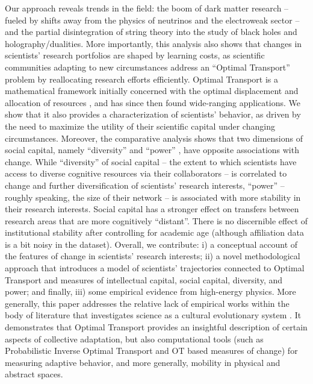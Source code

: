 \documentclass{article}
\begin{document}
Our approach reveals trends in the field: the boom of dark matter research -- fueled by shifts away from the physics of neutrinos and the electroweak sector -- and the partial disintegration of string theory into the study of black holes and holography/dualities. More importantly, this analysis also shows that changes in scientists' research portfolios are shaped by learning costs, as scientific communities adapting to new circumstances address an ``Optimal Transport'' problem by reallocating research efforts efficiently. Optimal Transport is a mathematical framework initially concerned with the optimal displacement and allocation of resources \citep{monge1781memoire,kantorovich2006translocation,Peyr2019}, and has since then found wide-ranging applications. We show that it also provides a characterization of scientists' behavior, as driven by the need to maximize the utility of their scientific capital under changing circumstances. Moreover, the comparative analysis shows that two dimensions of social capital, namely ``diversity'' and ``power'' \citep{Abbasi2014}, have opposite associations with change. While ``diversity'' of social capital  -- the extent to which scientists have access to diverse cognitive resources via their collaborators -- is correlated to change and further diversification of scientists' research interests, ``power'' -- roughly speaking, the size of their network -- is associated with more stability in their research interests. Social capital has a stronger effect on transfers between research areas that are more cognitively ``distant''. There is no discernible effect of institutional stability after controlling for academic age (although affiliation data is a bit noisy in the dataset). Overall, we contribute: i) a conceptual account of the features of change in scientists' research interests; ii) a novel methodological approach that introduces a model of scientists' trajectories connected to Optimal Transport and measures of intellectual capital, social capital, diversity, and power; and finally, iii) some empirical evidence from high-energy physics. More generally, this paper addresses the relative lack of empirical works within the body of literature that investigates science as a cultural evolutionary system \citep{Wu2023}. It demonstrates that Optimal Transport provides an insightful description of certain aspects of collective adaptation, but also computational tools (such as Probabilistic Inverse Optimal Transport \citep{pmlr-v162-chiu22b} and OT based measures of change) for measuring adaptive behavior, and more generally, mobility in physical and abstract spaces.
\end{document}
